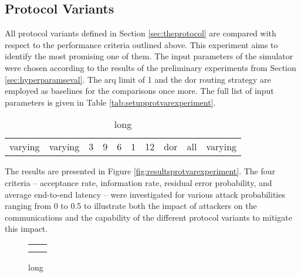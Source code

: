 \subsection{Protocol Variants}\label{subsec:protocolvariantseval}
All protocol variants defined in Section \ref{sec:theprotocol} are compared with respect to the performance criteria outlined above. This experiment
aims to identify the most promising one of them. The input parameters of the simulator were chosen according to the results of the preliminary
experiments from Section \ref{sec:hyperparamseval}. The \gls{arq} limit of 1 and the \gls{dor} routing strategy are employed as baselines for the
comparisons once more. The full list of input parameters is given in Table \vref{tab:setupprotvarexperiment}.

\begin{table}
    \centering
    \begin{tabulary}{\textwidth}{C|C|C|C|C|C|C|C|C|C}
        \pProtVar{} & \pNCMode{} & \pEncMods{} & \pAuthMods{} & \pRQSize{} & \pARQLimit{} & \pARQTimeout{} & \pRStrat{} & \pAttackerSet{} & \pAttackProb{} \\\hline
        varying & varying & 3 & 9 & 6 & 1 & 12 & \gls{dor} & all & varying \\
    \end{tabulary}
    \caption[Input parameters for protocol variant experiment]{long}
    \label{tab:setupprotvarexperiment}
\end{table}

The results are presented in Figure \vref{fig:resultsprotvarexperiment}. The four criteria -- acceptance rate, information rate, residual error
probability, and average end-to-end latency -- were investigated for various attack probabilities ranging from 0 to 0.5 to illustrate both the impact
of attackers on the communications and the capability of the different protocol variants to mitigate this impact.

\begin{figure}
    \centering
    \begin{tabular}{ll}
         &  \\
         & 
    \end{tabular}
    \caption[Results for protocol variant experiment]{long}
    \label{fig:resultsprotvarexperiment}
\end{figure}

